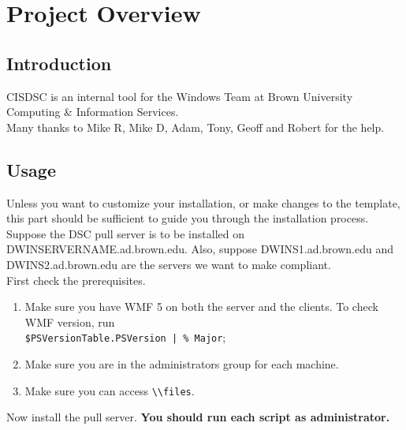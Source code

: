 \chapter{Project Overview}
\label{overview}

  \section{Introduction}
    CISDSC is an internal tool for the Windows Team at Brown University Computing \& Information Services.\\
    Many thanks to Mike R, Mike D, Adam, Tony, Geoff and Robert for the help.

  \section{Usage}
    Unless you want to customize your installation, or make changes to the template, this part should be sufficient to guide you through the installation process. Suppose the DSC pull server is to be installed on DWINSERVERNAME.ad.brown.edu. Also, suppose DWINS1.ad.brown.edu and DWINS2.ad.brown.edu are the servers we want to make compliant.\\
    First check the prerequisites.
    \begin{enumerate}[label=(\roman*)]
      \item Make sure you have WMF 5 on both the server and the clients. To check WMF version, run\\
      \verb^$PSVersionTable.PSVersion | % Major^;
      \item Make sure you are in the administrators group for each machine.
      \item Make sure you can access \verb^\\files^.
    \end{enumerate}
    Now install the pull server. \textbf{You should run each script as administrator.}
